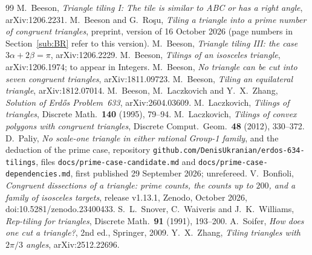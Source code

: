\documentclass[11pt,reqno]{amsart}
\theoremstyle{plain}
\theoremstyle{definition}
\begin{document}
\begin{thebibliography}{99}
 M.~Beeson, \emph{Triangle tiling I: The tile is similar to ABC or has a right angle}, arXiv:1206.2231.
 M.~Beeson and G.~Ro\c{s}u, \emph{Tiling a triangle into a prime number of congruent triangles}, preprint, version of 16 October 2026 (page numbers in Section~\ref{sub:BR} refer to this version).
 M.~Beeson, \emph{Triangle tiling III: the case $3\alpha+2\beta=\pi$}, arXiv:1206.2229.
 M.~Beeson, \emph{Tilings of an isosceles triangle}, arXiv:1206.1974; to appear in Integers.
 M.~Beeson, \emph{No triangle can be cut into seven congruent triangles}, arXiv:1811.09723.
 M.~Beeson, \emph{Tiling an equilateral triangle}, arXiv:1812.07014.
 M.~Beeson, M.~Laczkovich and Y.~X.~Zhang, \emph{Solution of Erd\H{o}s Problem~633}, arXiv:2604.03609.
 M.~Laczkovich, \emph{Tilings of triangles}, Discrete Math.\ \textbf{140} (1995), 79--94.
 M.~Laczkovich, \emph{Tilings of convex polygons with congruent triangles}, Discrete Comput.\ Geom.\ \textbf{48} (2012), 330--372.
 D.~Paliy, \emph{No scale-one triangle in either rational Group-1 family}, and the deduction of the prime case, repository \texttt{github.com/DenisUkranian/erdos-634-tilings}, files \texttt{docs/prime-case-candidate.md} and \texttt{docs/prime-case-dependencies.md}, first published 29 September 2026; unrefereed.
 V.~Bonfioli, \emph{Congruent dissections of a triangle: prime counts, the counts up to $200$, and a family of isosceles targets}, release v1.13.1, Zenodo, October 2026, doi:10.5281/zenodo.23400433.
 S.~L.~Snover, C.~Waiveris and J.~K.~Williams, \emph{Rep-tiling for triangles}, Discrete Math.\ \textbf{91} (1991), 193--200.
 A.~Soifer, \emph{How does one cut a triangle?}, 2nd ed., Springer, 2009.
 Y.~X.~Zhang, \emph{Tiling triangles with $2\pi/3$ angles}, arXiv:2512.22696.
\end{thebibliography}
\end{document}
